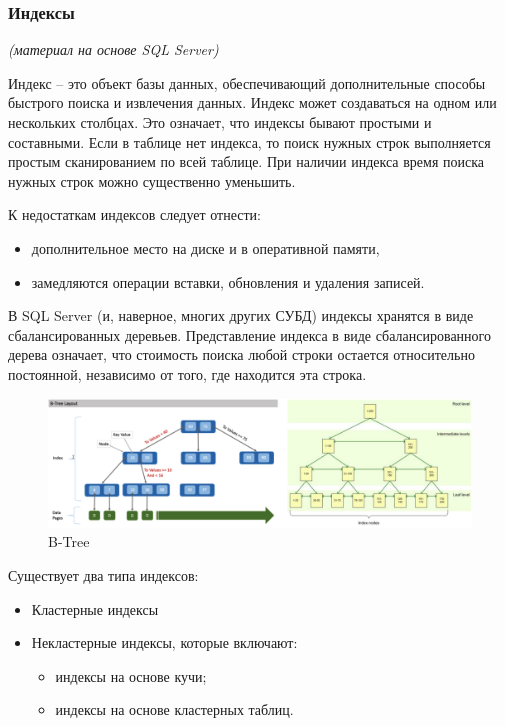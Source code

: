 \subsubsection{Индексы}
\textit{(материал на основе SQL Server)}

Индекс – это объект базы данных, обеспечивающий дополнительные способы быстрого поиска и извлечения данных. Индекс может создаваться на одном или нескольких столбцах. 
Это означает, что индексы бывают простыми и составными. Если в таблице нет индекса, то поиск нужных строк выполняется простым сканированием по всей таблице. При наличии индекса время поиска нужных строк можно существенно уменьшить. 

К недостаткам индексов следует отнести:
\begin{itemize}
	\item дополнительное место на диске и в оперативной памяти, 
	\item замедляются операции вставки, обновления и удаления записей. 
\end{itemize}

В SQL Server (и, наверное, многих других СУБД) индексы хранятся в виде сбалансированных деревьев. Представление индекса в виде сбалансированного дерева означает, что стоимость поиска любой строки остается относительно постоянной, независимо от того, где находится эта строка. 

\begin{figure}[h]
	\centering
	\includegraphics[width=18cm, keepaspectratio]{assets/index.png}
	\caption{B-Tree} 
\end{figure}

Существует два типа индексов: 

\begin{itemize}
	\item Кластерные индексы
	\item Некластерные индексы, которые включают: 
	\begin{itemize}[label=--]
		\item индексы на основе кучи;
		\item индексы на основе кластерных таблиц.
	\end{itemize}
\end{itemize}

